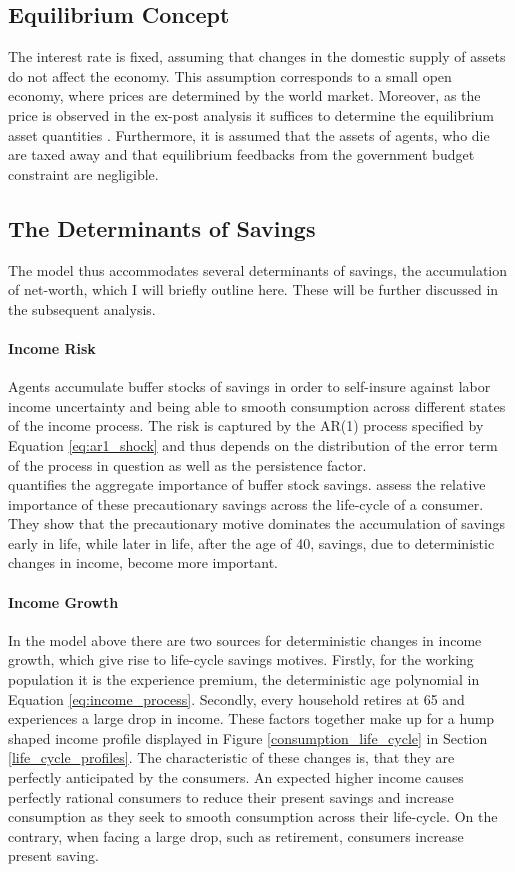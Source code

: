 \documentclass[a4paper,12pt,legno]{article}
\begin{document}
\subsection{Equilibrium Concept}
The interest rate is fixed, assuming that changes in the domestic supply of assets do not affect the economy. This assumption corresponds to a small open economy, where prices are determined by the world market. Moreover, as the price is observed in the ex-post analysis it suffices to determine the equilibrium asset quantities \citep{hintermaier2011}. Furthermore, it is assumed that the assets of agents, who die are taxed away and that equilibrium feedbacks from the government budget constraint are negligible. 


\subsection{The Determinants of Savings}
\label{determinants}
The model thus accommodates several determinants of savings, the accumulation of net-worth, which I will briefly outline here. These will be further discussed in the subsequent analysis. 


\paragraph{Income Risk} Agents accumulate buffer stocks of savings in order to self-insure against labor income uncertainty and being able to smooth consumption across different states of the income process. The risk is captured by the AR(1) process specified by Equation \ref{eq:ar1_shock} and thus depends on the distribution of the error term of the process in question as well as the persistence factor. \\
\cite{aiyagari1994} quantifies the aggregate importance of buffer stock savings. \cite{Gourinchas&Parker2002} assess the relative importance of these precautionary savings across the life-cycle of a consumer. They show that the precautionary motive dominates the accumulation of savings early in life, while later in life, after the age of 40, savings, due to deterministic changes in income, become more important. 

\paragraph{Income Growth} In the model above there are two sources for deterministic changes in income growth, which give rise to life-cycle savings motives. Firstly, for the working population it is the experience premium, the deterministic age polynomial in Equation \ref{eq:income_process}. Secondly, every household retires at 65 and experiences a large drop in income. These factors together make up for a hump shaped income profile displayed in Figure \ref{consumption_life_cycle} in Section \ref{life_cycle_profiles}. The characteristic of these changes is, that they are perfectly anticipated by the consumers. An expected higher income causes perfectly rational consumers to reduce their present savings and increase consumption as they seek to smooth consumption across their life-cycle. On the contrary, when facing a large drop, such as retirement, consumers increase present saving. 
\end{document}
